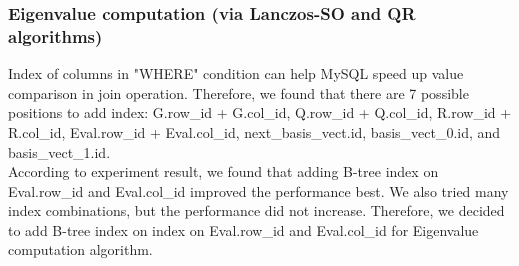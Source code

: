 \subsubsection{Eigenvalue computation (via Lanczos-SO and QR algorithms)}

Index of columns in "WHERE" condition can help MySQL speed up value comparison in join operation. Therefore, we found that there are 7 possible positions to add index: G.row\_id + G.col\_id, Q.row\_id + Q.col\_id, R.row\_id + R.col\_id, Eval.row\_id + Eval.col\_id, next\_basis\_vect.id, basis\_vect\_0.id, and basis\_vect\_1.id. 
\\
According to experiment result, we found that adding B-tree index on Eval.row\_id and Eval.col\_id improved the performance best. We also tried many index combinations, but the performance did not increase. Therefore, we decided to add B-tree index on index on Eval.row\_id and Eval.col\_id  for Eigenvalue computation algorithm.

